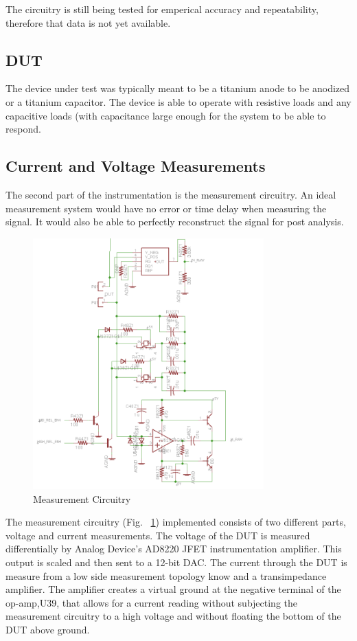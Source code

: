 \documentclass[journal]{IEEEtran}
\begin{document}
The circuitry is still being tested for emperical accuracy and repeatability, therefore that data is not yet available.

\subsection{DUT}

The device under test was typically meant to be a titanium anode to be anodized or a titanium capacitor. The device is able to operate with resistive loads and any capacitive loads (with capacitance large enough for the system to be able to respond.


\subsection{Current and Voltage Measurements}

The second part of the instrumentation is the measurement circuitry. An ideal measurement system would have no error or time delay when measuring the signal. It would also be able to perfectly reconstruct the signal for post analysis. 
 

\begin{figure}[here]
\centering
\includegraphics[width=3.5in]{measCir}
\caption{Measurement Circuitry}
\label{fig:measCir}
\end{figure}

The measurement circuitry (Fig. ~\ref{fig:measCir}) implemented consists of two different parts, voltage and current measurements. The voltage of the DUT is measured differentially by Analog Device’s AD8220 JFET instrumentation amplifier. This output is scaled and then sent to a 12-bit DAC. The current through the DUT is measure from a low side measurement topology know and a transimpedance amplifier. The amplifier creates a virtual ground at the negative terminal of the op-amp,U39, that allows for a current reading without subjecting the measurement circuitry to a high voltage and without floating the bottom of the DUT above ground.
\end{document}
